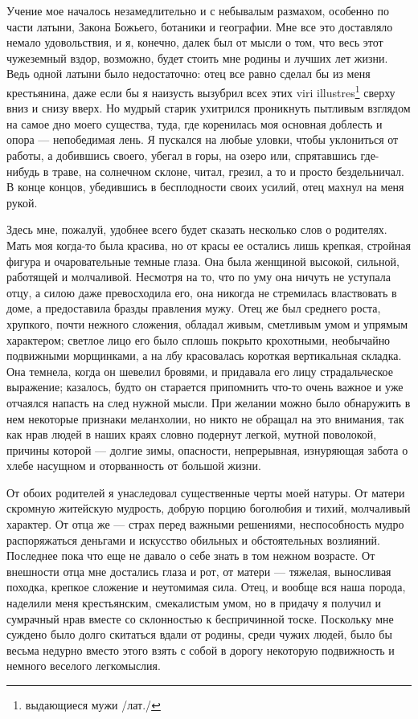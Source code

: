 Учение мое  началось незамедлительно и с  небывалым размахом, особенно
по части  латыни, Закона  Божьего, ботаники и  географии. Мне  все это
доставляло немало  удовольствия, и  я, конечно, далек  был от  мысли о
том, что весь этот чужеземный вздор, возможно, будет стоить мне родины
и  лучших лет  жизни. Ведь  одной латыни  было недостаточно:  отец все
равно сделал бы из меня крестьянина,  даже если бы я наизусть вызубрил
всех этих viri illustres\footnote{выдающиеся  мужи /лат./} сверху вниз
и снизу вверх. Но мудрый старик ухитрился проникнуть пытливым взглядом
на  самое  дно  моего  существа, туда,  где  коренилась  моя  основная
доблесть и  опора ---  непобедимая лень. Я  пускался на  любые уловки,
чтобы  уклониться от  работы, а  добившись своего,  убегал в  горы, на
озеро или, спрятавшись где-нибудь в траве, на солнечном склоне, читал,
грезил,  а то  и просто  бездельничал.  В конце  концов, убедившись  в
бесплодности своих усилий, отец махнул на меня рукой.

Здесь  мне, пожалуй,  удобнее  всего будет  сказать  несколько слов  о
родителях. Мать  моя когда-то  была красива, но  от красы  ее остались
лишь крепкая, стройная фигура и  очаровательные темные глаза. Она была
женщиной высокой, сильной, работящей и молчаливой. Несмотря на то, что
по  уму  она  ничуть  не  уступала отцу,  а  силою  даже  превосходила
его,  она никогда  не стремилась  властвовать в  доме, а  предоставила
бразды правления  мужу. Отец  же был  среднего роста,  хрупкого, почти
нежного сложения, обладал живым,  сметливым умом и упрямым характером;
светлое лицо его было сплошь покрыто крохотными, необычайно подвижными
морщинками, а  на лбу  красовалась короткая вертикальная  складка. Она
темнела, когда он шевелил бровями, и придавала его лицу страдальческое
выражение; казалось, будто он старается припомнить что-то очень важное
и уже  отчаялся напасть на след  нужной мысли. При желании  можно было
обнаружить в нем некоторые признаки меланхолии, но никто не обращал на
это  внимания,  так как  нрав  людей  в  наших краях  словно  подернут
легкой, мутной поволокой, причины  которой --- долгие зимы, опасности,
непрерывная,  изнуряющая забота  о  хлебе насущном  и оторванность  от
большой жизни.

От обоих  родителей я унаследовал  существенные черты моей  натуры. От
матери скромную  житейскую мудрость, добрую порцию  боголюбия и тихий,
молчаливый характер.  От отца  же ---  страх перед  важными решениями,
неспособность  мудро распоряжаться  деньгами  и  искусство обильных  и
обстоятельных возлияний. Последнее пока что еще не давало о себе знать
в том нежном возрасте. От внешности отца мне достались глаза и рот, от
матери --- тяжелая, выносливая  походка, крепкое сложение и неутомимая
сила.  Отец, и  вообще вся  наша порода,  наделили меня  крестьянским,
смекалистым умом,  но в придачу я  получил и сумрачный нрав  вместе со
склонностью  к беспричинной  тоске. Поскольку  мне суждено  было долго
скитаться вдали от  родины, среди чужих людей, было  бы весьма недурно
вместо этого  взять с собой  в дорогу некоторую подвижность  и немного
веселого легкомыслия.

